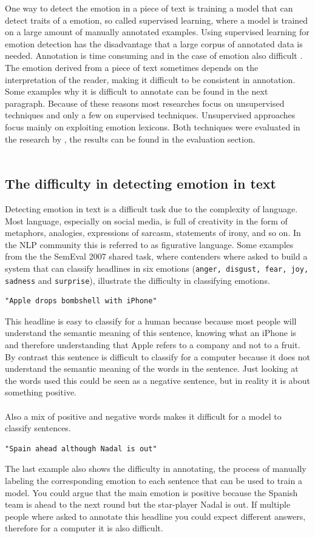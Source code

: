 \documentclass[11pt]{article}
\begin{document}
One way to detect the emotion in a piece of text is training a model that can detect traits of a emotion, so called supervised learning, where a model is trained on a large amount of manually annotated examples. Using supervised learning for emotion detection has the disadvantage that a large corpus of annotated data is needed. Annotation is time consuming and in the case of emotion also difficult \cite{kim2010evaluation}. The emotion derived from a piece of text sometimes depends on the interpretation of the reader, making it difficult to be consistent in annotation. Some examples why it is difficult to annotate can be found in the next paragraph. Because of these reasons most researches focus on unsupervised techniques \cite{kim2010evaluation} and only a few on supervised techniques. Unsupervised approaches focus mainly on exploiting emotion lexicons. Both techniques were evaluated in the research by \cite{strapparava2008learning}, the results can be found in the evaluation section.\\\\

\subsection{The difficulty in detecting emotion in text}
Detecting emotion in text is a difficult task due to the complexity of language. Most language, especially on social media, is full of creativity in the form of metaphors, analogies, expressions of sarcasm, statements of irony, and so on. In the NLP community this is referred to as figurative language. Some examples from the the SemEval 2007 shared task, where contenders where asked to build a system that can classify headlines in six emotions (\texttt{anger, disgust, fear, joy, sadness} and \texttt{surprise}), illustrate the difficulty in classifying emotions.
\begin{lstlisting}
"Apple drops bombshell with iPhone"
\end{lstlisting}
This headline is easy to classify for a human because because most people will understand the semantic meaning of this sentence, knowing what an iPhone is and therefore understanding that Apple refers to a company and not to a fruit. By contrast this sentence is difficult to classify for a computer because it does not understand the semantic meaning of the words in the sentence. Just looking at the words used this could be seen as a negative sentence, but in reality it is about something positive. \\\\
Also a mix of positive and negative words makes it difficult for a model to classify sentences.
\begin{lstlisting}
"Spain ahead although Nadal is out"
\end{lstlisting}
The last example also shows the difficulty in annotating, the process of manually labeling the corresponding emotion to each sentence that can be used to train a model. You could argue that the main emotion is positive because the Spanish team is ahead to the next round but the star-player Nadal is out. If multiple people where asked to annotate this headline you could expect different answers, therefore for a computer it is also difficult. 
\end{document}
